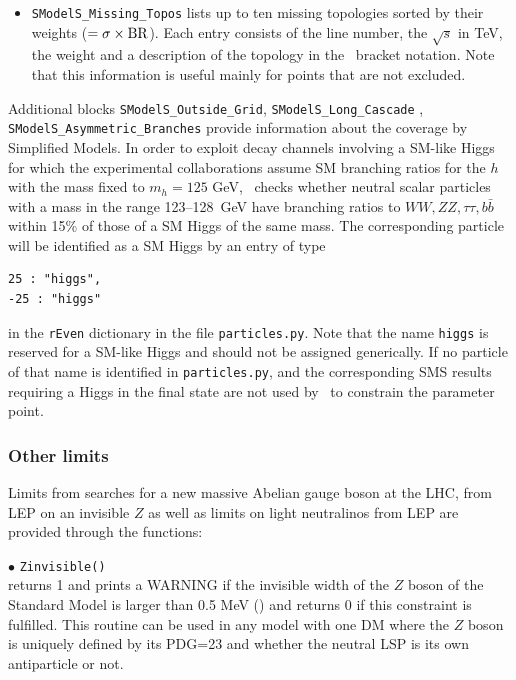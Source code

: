 \documentclass[12pt,a4paper]{article}
\begin{document}
{\begin{itemize}
\item {\tt SModelS\_Missing\_Topos} lists up to ten missing topologies sorted by their weights ($ = \sigma\times {\rm BR}$).  Each entry consists of the line number, the $\sqrt{s}$ in TeV, the weight and a description of the topology in the \smodels\ bracket notation. Note that this information is useful mainly for points that are not excluded.
 
\end{itemize}
  
Additional blocks  {\tt SModelS\_Outside\_Grid}, {\tt SModelS\_Long\_Cascade} , {\tt SModelS\_Asymmetric\_Branches}  provide  information about the coverage by Simplified Models.
In order to  exploit decay channels involving a SM-like Higgs for which the experimental collaborations assume  
SM branching ratios for the $h$ with the mass fixed to $m_h=125$ GeV, \micro\ checks whether  
neutral scalar particles with a mass in the range 123--128~GeV have branching ratios to $WW,ZZ,\tau\tau, b\bar{b}$ within 15\% of those of a SM Higgs of the same mass. 
The corresponding particle will be identified as a SM Higgs 
by an entry of type
\begin{verbatim}
25 : "higgs",
-25 : "higgs"
\end{verbatim}
in the {\tt rEven} dictionary in the file {\tt particles.py}.    
Note that the name {\tt higgs} is reserved for a SM-like Higgs and should not be assigned generically. 
If no particle of that name is identified in {\tt particles.py},  and the corresponding SMS results requiring a Higgs in the final state are not used by \smodels\ to constrain the parameter point.

\subsubsection{Other limits}

Limits from searches for a new massive Abelian gauge boson at the LHC, from LEP on an invisible $Z$ as well as limits on light neutralinos from LEP are provided through the functions: 


\noi$\bullet$ \verb|Zinvisible()|\\
returns 1 and prints a WARNING if the invisible width of the $Z$ boson of the Standard Model 
is larger than 0.5 MeV (\cite{Freitas:2014hra}) and returns 0 if this constraint is fulfilled.
This routine can be used in any model with one DM where the $Z$ boson is  uniquely defined by its PDG=23 and whether the neutral LSP is its own antiparticle or not.\\

}
\end{document}
